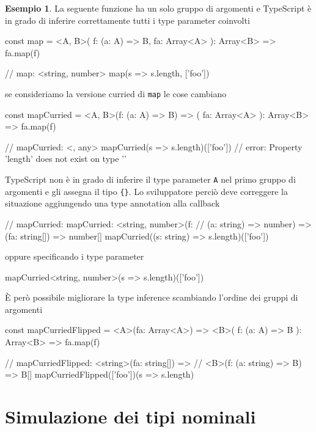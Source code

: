 \documentclass[12pt]{article}
\theoremstyle{definition}
\newtheorem{example}{Esempio}[subsection]
\newenvironment{code}
  {\vspace{0.5cm} \VerbatimEnvironment\begin{typescriptcode}}
  {\end{typescriptcode} \vspace{0.2cm}}
\begin{document}
\begin{example}
La seguente funzione ha un solo gruppo di argomenti e TypeScript è in grado di inferire correttamente tutti i type parameter coinvolti

\begin{code}
const map = <A, B>(
  f: (a: A) => B,
  fa: Array<A>
): Array<B> => fa.map(f)

// map: <string, number>
map(s => s.length, ['foo'])
\end{code}

se consideriamo la versione curried di \texttt{map} le cose cambiano

\begin{code}
const mapCurried = <A, B>(f: (a: A) => B) => (
  fa: Array<A>
): Array<B> => fa.map(f)

// mapCurried: <{}, any>
mapCurried(s => s.length)(['foo'])
// error: Property 'length' does not exist on type '{}'
\end{code}

TypeScript non è in grado di inferire il type parameter \texttt{A} nel primo gruppo di argomenti e gli assegna il tipo \texttt{\{\}}.
Lo sviluppatore perciò deve correggere la situazione aggiungendo una type annotation alla callback

\begin{code}
// mapCurried: mapCurried: <string, number>(f:
// (a: string) => number) => (fa: string[]) => number[]
mapCurried((s: string) => s.length)(['foo'])
\end{code}

oppure specificando i type parameter

\begin{code}
mapCurried<string, number>(s => s.length)(['foo'])
\end{code}

È però possibile migliorare la type inference scambiando l'ordine dei gruppi di argomenti

\begin{code}
const mapCurriedFlipped = <A>(fa: Array<A>) => <B>(
  f: (a: A) => B
): Array<B> => fa.map(f)

// mapCurriedFlipped: <string>(fa: string[]) =>
// <B>(f: (a: string) => B) => B[]
mapCurriedFlipped(['foo'])(s => s.length)
\end{code}
\end{example}

\newpage
\section{Simulazione dei tipi nominali}
\end{document}
